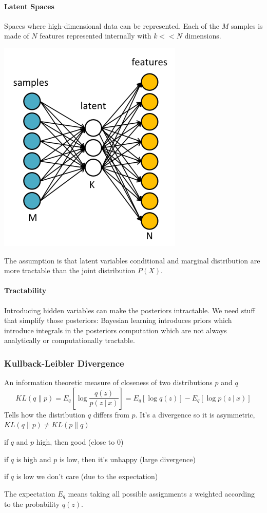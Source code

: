 \documentclass[10pt]{report}
\begin{document}
\paragraph{Latent Spaces} Spaces where high-dimensional data can be represented. Each of the $M$ samples is made of $N$ features represented internally with $k<<N$ dimensions.
\begin{center}
	\includegraphics[scale=0.5]{39.png}
\end{center}
The assumption is that latent variables conditional and marginal distribution are more tractable than the joint distribution $P(X)$.
\paragraph{Tractability} Introducing hidden variables can make the posteriors intractable. We need stuff that simplify those posteriors: Bayesian learning introduces priors which introduce integrals in the posteriors computation which are not always analytically or computationally tractable.
\subsubsection{Kullback-Leibler Divergence}
An information theoretic measure of closeness of two distributions $p$ and $q$ $$KL(q\|p) = E_q\left[\log\frac{q(z)}{p(z\:|\:x)}\right] = E_q[\log q(z)] - E_q[\log p(z\:|\:x)]$$
Tells how the distribution $q$ differs from $p$. It's a divergence so it is asymmetric, $KL(q\|p) \neq KL(p\|q)$\begin{list}{}{}
	\item if $q$ and $p$ high, then good (close to $0$)
	\item if $q$ is high and $p$ is low, then it's unhappy (large divergence)
	\item if $q$ is low we don't care (due to the expectation)
\end{list}
The expectation $E_q$ means taking all possible assignments $z$ weighted according to the probability $q(z)$.
\end{document}
